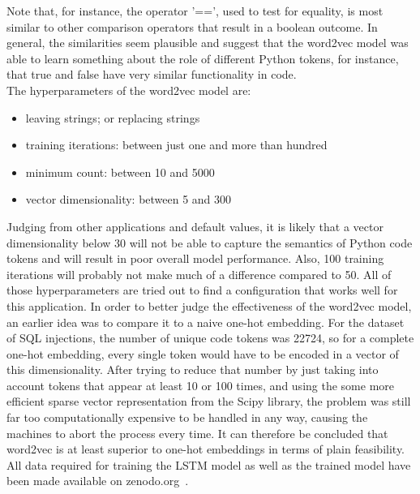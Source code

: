 \documentclass[
a4paper,
pagesize,
pdftex,
12pt,
twoside, %
BCOR=5mm, %
ngerman,
fleqn,
final,
]{scrartcl}
\begin{document}
	Note that, for instance, the operator '==', used to test for equality, is most similar to other comparison operators that result in a boolean outcome. In general, the similarities seem plausible and suggest that the word2vec model was able to learn something about the role of different Python tokens, for instance, that true and false have very similar functionality in code.\\ 
	The hyperparameters of the word2vec model are:
	\begin{itemize}[noitemsep]
		\item leaving strings; or replacing strings
		\item training iterations: between just one and more than hundred
		\item minimum count: between 10 and 5000
		\item vector dimensionality: between 5 and 300
	\end{itemize}
	
	Judging from other applications and default values, it is likely that a vector dimensionality below 30 will not be able to capture the semantics of Python code tokens and will result in poor overall model performance. Also, 100 training iterations will probably not make much of a difference compared to 50. All of those hyperparameters are tried out to find a configuration that works well for this application.
	In order to better judge the effectiveness of the word2vec model, an earlier idea was to compare it to a naive one-hot embedding. For the dataset of SQL injections, the number of unique code tokens was 22724, so for a complete one-hot embedding, every single token would have to be encoded in a vector of this dimensionality. After trying to reduce that number by just taking into account tokens that appear at least 10 or 100 times, and using the some more efficient sparse vector representation from the Scipy library, the problem was still far too computationally expensive to be handled in any way, causing the machines to abort the process every time. It can therefore be concluded that word2vec is at least superior to one-hot embeddings in terms of plain feasibility.\\
	All data required for training the LSTM model as well as the trained model have been made available on zenodo.org~\cite{Wartschinski.2.12.2019}.
	
	
	
\end{document}

